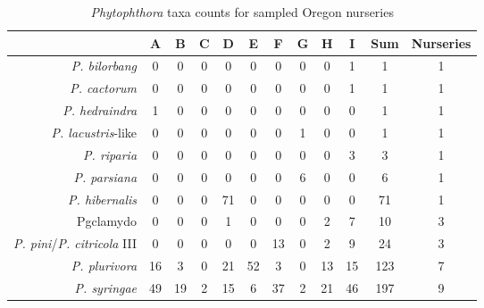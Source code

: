 \documentclass[12pt]{article}
\begin{document}
\begin{table}[ht]
\caption{\emph{Phytophthora} taxa counts for sampled Oregon nurseries}
\centering
\begin{tabular}{rccccccccccc}
  \hline
 & A & B & C & D & E & F & G & H & I & Sum & Nurseries \\
  \hline
  \emph{P. bilorbang} & 0 & 0 & 0 & 0 & 0 & 0 & 0 & 0 & 1 & 1 & 1 \\
  \emph{P. cactorum} & 0 & 0 & 0 & 0 & 0 & 0 & 0 & 0 & 1 & 1 & 1 \\
  \emph{P. hedraindra}  & 1 & 0 & 0 & 0 & 0 & 0 & 0 & 0 & 0 & 1 & 1 \\
  \emph{P. lacustris}-like & 0 & 0 & 0 & 0 & 0 & 0 & 1 & 0 & 0 & 1 & 1 \\
  \emph{P. riparia} & 0 & 0 & 0 & 0 & 0 & 0 & 0 & 0 & 3 & 3 & 1 \\
  \emph{P. parsiana} & 0 & 0 & 0 & 0 & 0 & 0 & 6 & 0 & 0 & 6 & 1 \\
  \emph{P. hibernalis} & 0 & 0 & 0 & 71 & 0 & 0 & 0 & 0 & 0 & 71 & 1 \\
  Pgclamydo & 0 & 0 & 0 & 1 & 0 & 0 & 0 & 2 & 7 & 10 & 3 \\
  \emph{P. pini}/\emph{P. citricola} III & 0 & 0 & 0 & 0 & 0 & 13 & 0 & 2 & 9 & 24 & 3 \\
  \emph{P. plurivora} & 16 & 3 & 0 & 21 & 52 & 3 & 0 & 13 & 15 & 123 & 7 \\
  \emph{P. syringae} & 49 & 19 & 2 & 15 & 6 & 37 & 2 & 21 & 46 & 197 & 9 \\
   \hline
\end{tabular}
\label{tab:taxa_counts}
\end{table}
\end{document}
